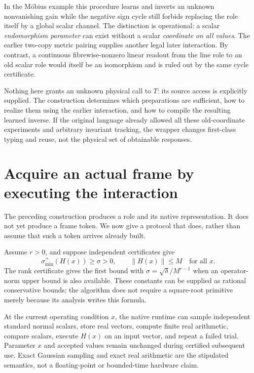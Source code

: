 \documentclass[11pt]{article}
\theoremstyle{definition}
\theoremstyle{remark}
\begin{document}
In the M\"obius example this procedure learns and inverts an unknown nonvanishing gain while the negative sign cycle still forbids replacing the role itself by a global scalar channel. The distinction is operational: a scalar \emph{endomorphism parameter} can exist without a scalar \emph{coordinate on all values}. The earlier two-copy metric pairing supplies another legal later interaction. By contrast, a continuous fibrewise-nonzero linear readout from the line role to an old scalar role would itself be an isomorphism and is ruled out by the same cycle certificate.

Nothing here grants an unknown physical call to $T$: its source access is explicitly supplied. The construction determines which preparations are sufficient, how to realize them using the earlier interaction, and how to compile the resulting learned inverse. If the original language already allowed all these old-coordinate experiments and arbitrary invariant tracking, the wrapper changes first-class typing and reuse, not the physical set of obtainable responses.



\section{Acquire an actual frame by executing the interaction}\label{sec:acquisition}
The preceding construction produces a role and its native representation. It does not yet produce a frame token. We now give a protocol that does, rather than assume that such a token arrives already built.

Assume $r>0$, and suppose independent certificates give
\[
 \sigma_{\min}^{+}(H(x))\ge\sigma>0,\qquad \|H(x)\|\le M
 \quad\text{for all }x.
\]
The rank certificate gives the first bound with $\sigma=\sqrt\delta/M^{r-1}$ when an operator-norm upper bound is also available. These constants can be supplied as rational conservative bounds; the algorithm does not require a square-root primitive merely because its analysis writes this formula.

At the current operating condition $x$, the native runtime can sample independent standard normal scalars, store real vectors, compute finite real arithmetic, compare scalars, execute $H(x)$ on an input vector, and repeat a failed trial. Parameter $x$ and accepted values remain unchanged during certified subsequent use. Exact Gaussian sampling and exact real arithmetic are the stipulated semantics, not a floating-point or bounded-time hardware claim.
\end{document}
